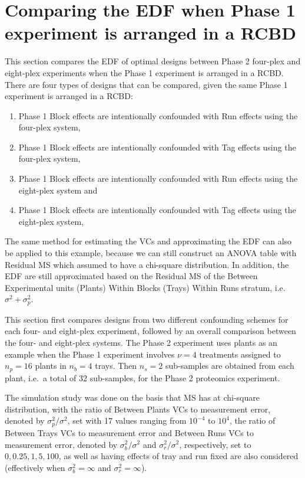 \section{Comparing the EDF when Phase 1 experiment is arranged in a RCBD}
\label{sec:expRCBD}
This section compares the EDF of optimal designs between Phase 2 four-plex and eight-plex experiments when the Phase 1 experiment is arranged in a RCBD. There are four types of designs that can be compared, given the same Phase 1 experiment is arranged in a RCBD: 
\begin{enumerate}
\item Phase 1 Block effects are intentionally confounded with Run effects using the four-plex system,
\item Phase 1 Block effects are intentionally confounded with Tag effects using the four-plex system,
\item Phase 1 Block effects are intentionally confounded with Run effects using the eight-plex system and
\item Phase 1 Block effects are intentionally confounded with Tag effects using the eight-plex system,
\end{enumerate}
The same method for estimating the VCs and approximating the EDF can also be applied to this example, because we can still construct an ANOVA table with Residual MS which assumed to have a chi-square distribution. In addition, the EDF are still approximated based on the Residual MS of the Between Experimental units (Plants) Within Blocks (Trays) Within Runs stratum, i.e.\ $\sigma^2 + \sigma_p^2$.

This section first compares designs from two different confounding schemes for each four- and eight-plex experiment, followed by an overall comparison between the four- and eight-plex systems. The Phase 2 experiment uses plants as an example when the Phase 1 experiment involves $\nu = 4$ treatments assigned to $n_p = 16$ plants in $n_b = 4$ trays. Then $n_s = 2$ sub-samples are obtained from each plant, i.e.\ a total of 32 sub-samples, for the Phase 2 proteomics experiment.  

The simulation study was done on the basis that MS has at chi-square distribution, with the ratio of Between Plants VCs to measurement error, denoted by $\sigma_p^2/\sigma^2$, set with 17 values ranging from $10^{-4}$ to $10^4$, the ratio of Between Trays VCs to measurement error and Between Runs VCs to measurement error, denoted by $\sigma_b^2/\sigma^2$ and $\sigma_r^2/\sigma^2$, respectively, set to $0, 0.25, 1, 5, 100$, as well as having effects of tray and run fixed are also considered (effectively when $\sigma _b^2 = \infty$ and $\sigma _r^2 = \infty$). 

